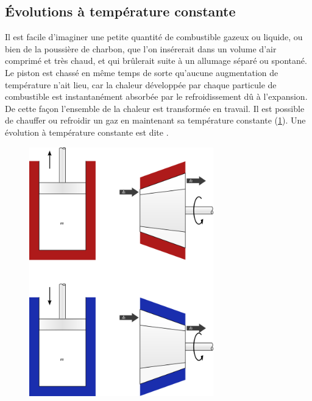 	\subsection{Évolutions à température constante}
	\label{ch_gp_isothermes}
	
			Il est facile d’imaginer une petite quantité de combustible gazeux ou liquide, ou bien de la poussière de charbon, que l’on insérerait dans un volume d’air comprimé et très chaud, et qui brûlerait suite à un allumage séparé ou spontané. Le piston est chassé en même temps de sorte qu’aucune augmentation de température n’ait lieu, car la chaleur développée par chaque particule de combustible est instantanément absorbée par le refroidissement dû à l’expansion. De cette façon l’ensemble de la chaleur est transformée en travail.
		Il est possible de chauffer ou refroidir un gaz en maintenant sa température constante (\cref{fig_gp_température_constante}). Une évolution à température constante est dite .
		
		\begin{figure}
			\begin{center}
				\includegraphics[width=8cm]{images/temperature_constante.png}
			\end{center}
			\label{fig_gp_température_constante}
		\end{figure}
		

